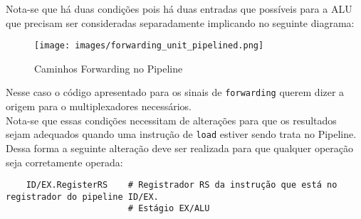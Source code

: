 \documentclass{article}
\begin{document}
\noindent Nota-se que há duas condições pois há duas entradas que possíveis para a ALU que precisam ser consideradas separadamente implicando no seguinte diagrama:
\begin{figure}[H]
    \centering
    \texttt{[image: images/forwarding\_unit\_pipelined.png]}
    \caption{Caminhos Forwarding no Pipeline}
    \label{forwardingPath}
\end{figure}
\noindent Nesse caso o código apresentado para os sinais de \texttt{forwarding} querem dizer a origem para o multiplexadores necessários.\\

\noindent Nota-se que essas condições necessitam de alterações para que os resultados sejam adequados quando uma instrução de \texttt{load} estiver sendo trata no Pipeline. Dessa forma a seguinte alteração deve ser realizada para que qualquer operação seja corretamente operada:
\begin{scriptsize}
    \myStyleRISCV
    \begin{lstlisting}
    ID/EX.RegisterRS    # Registrador RS da instrução que está no registrador do pipeline ID/EX.
                        # Estágio EX/ALU
    \end{lstlisting}
\end{scriptsize}
\end{document}
